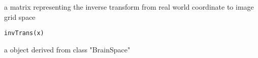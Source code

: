 \begin{Description}\relax
a matrix representing the inverse transform from real world coordinate
to image grid space
\end{Description}
\begin{Usage}
\begin{verbatim}
invTrans(x)
\end{verbatim}
\end{Usage}
\begin{Arguments}
\begin{ldescription}
\item[\code{x}] a object derived from class "BrainSpace" 
\end{ldescription}
\end{Arguments}

